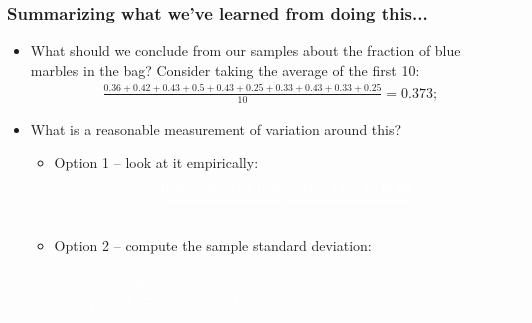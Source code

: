 \documentclass[aspectratio=169]{beamer}
\theoremstyle{principle}
\begin{document}
\begin{frame}
\frametitle{Summarizing what we've learned from doing this...}
\begin{itemize}
\item What should we conclude from our samples about the fraction of blue marbles in the bag?  Consider taking the average of the first 10:
\begin{align*}
\frac{0.36 + 0.42 + 0.43 + 0.5 + 0.43 + 0.25 + 0.33 + 0.43 + 0.33 + 0.25}{10} = 0.373;
\end{align*}
\bigskip

\item What is a reasonable measurement of variation around this?
\begin{itemize}
\item[]\color{white} Option 1 -- look at it empirically:
\begin{align*}
\color{white}0.25,\underbrace{\textbf{0.25},0.33,0.33,0.36,0.42,0.43,0.43,\textbf{0.43}}_{\mbox{middle 80\% of data}},0.5
\end{align*}
\item[]\color{white} Option 2 -- compute the sample standard deviation:
\begin{align*}
\color{white}\sigma = \sqrt{\frac{1}{n-1}\sum_{i=1}^n(x_i - \overline{x})^2} = \sqrt{\frac{(0.25 - 0.373)^2 + \hdots + (0.5 - 0.373)^2}{10 - 1}}\approx 0.083.
\end{align*}
\end{itemize}

\end{itemize}
\end{frame}
\end{document}
